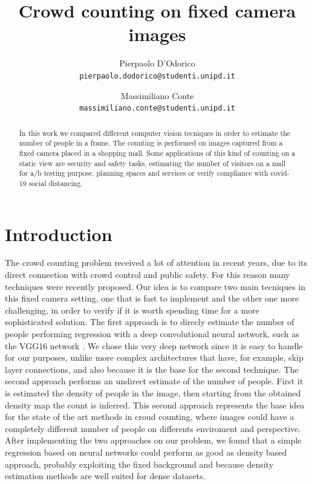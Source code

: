 \documentclass[10pt,twocolumn,letterpaper]{article}
\begin{document}
\title{Crowd counting on fixed camera images}

\author{Pierpaolo D'Odorico\\
{\tt\small pierpaolo.dodorico@studenti.unipd.it}
\and
Massimiliano Conte\\
{\tt\small massimiliano.conte@studenti.unipd.it}
}


\maketitle
\begin{abstract}



In this work we compared different computer vision tecniques in order to estimate the number of people in a frame. The counting is performed on images captured from a fixed camera placed in a shopping mall. Some applications of this kind of counting on a static view are security and safety tasks, estimating the number of visitors on a mall for a/b testing purpose, planning spaces and services or verify compliance with covid-19 social distancing.

\end{abstract}

\section{Introduction}

The crowd counting problem received a lot of attention in recent years, due to its direct connection with crowd control and public safety. For this reason many techniques were recently proposed.
Our idea is to compare two main tecniques in this fixed camera setting, one that is fast to implement and the other one more challenging, in order to verify if it is worth spending time for a more sophisticated solution. The first approach is to direcly estimate the number of people performing regression with a deep convolutional neural network, such as the VGG16 network \cite{simonyan2014very}. We chose this very deep network since it is easy to handle for our purposes, unlike more complex architectures that have, for example, skip layer connections, and also because it is the base for the second technique. The second approach performs an undirect estimate of the number of people. First it is estimated the density of people in the image, then starting from the obtained density map the count is inferred. This second approach represents the base idea for the state of the art methods in croud counting, where images could have a completely different number of people on  differents enviroment and perspective. After implementing the two approaches on our problem, we found that a simple regression based on neural networks could perform as good as density based approach, probably exploiting the fixed background and because density estimation methods are well suited for dense datasets.
\end{document}
